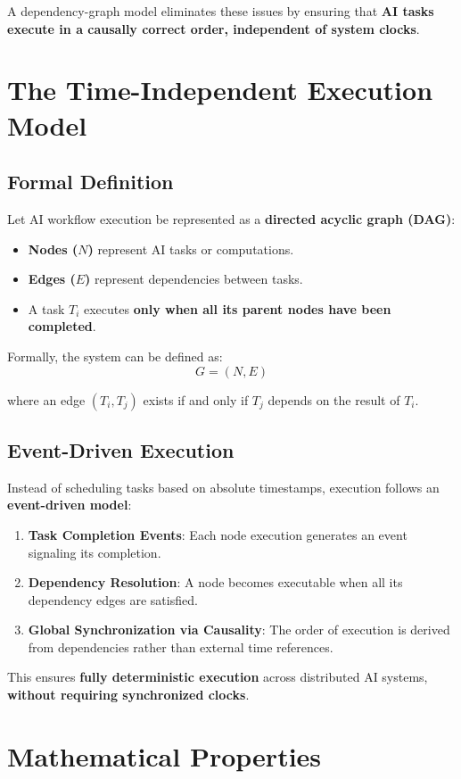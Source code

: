 \documentclass{article}
\begin{document}
A dependency-graph model eliminates these issues by ensuring that \textbf{AI tasks execute in a causally correct order, independent of system clocks}.

\section{The Time-Independent Execution Model}
\subsection{Formal Definition}
Let AI workflow execution be represented as a \textbf{directed acyclic graph (DAG)}:
\begin{itemize}
    \item \textbf{Nodes ($N$)} represent AI tasks or computations.
    \item \textbf{Edges ($E$)} represent dependencies between tasks.
    \item A task $T_i$ executes \textbf{only when all its parent nodes have been completed}.
\end{itemize}

Formally, the system can be defined as:
\[
G = (N, E)
\]

where an edge $(T_i, T_j)$ exists if and only if $T_j$ depends on the result of $T_i$.

\subsection{Event-Driven Execution}
Instead of scheduling tasks based on absolute timestamps, execution follows an \textbf{event-driven model}:
\begin{enumerate}
    \item \textbf{Task Completion Events}: Each node execution generates an event signaling its completion.
    \item \textbf{Dependency Resolution}: A node becomes executable when all its dependency edges are satisfied.
    \item \textbf{Global Synchronization via Causality}: The order of execution is derived from dependencies rather than external time references.
\end{enumerate}

This ensures \textbf{fully deterministic execution} across distributed AI systems, \textbf{without requiring synchronized clocks}.

\section{Mathematical Properties}
\end{document}
